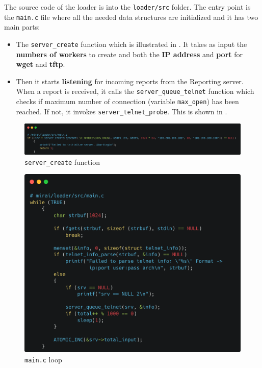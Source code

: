 The source code of the loader is into the \texttt{loader/src} folder. The entry point is the \texttt{main.c} file where all the needed data structures are initialized and it has two main parts:

\begin{itemize}
    \item The \texttt{server\_create} function which is illustrated in . It takes as input the \textbf{numbers of workers} to create and both the \textbf{IP address} and \textbf{port} for \textbf{wget} and \textbf{tftp}.
    \item Then it starts \textbf{listening} for incoming reports from the Reporting server. When a report is received, it calls the \texttt{server\_queue\_telnet} function which checks if maximum number of connection (variable \texttt{max\_open}) has been reached. If not, it invokes \texttt{server\_telnet\_probe}. This is shown in .
\end{itemize}

\begin{figure}[ht]
    \centering
    \includegraphics[scale=0.1]{resources/images/server_create.png}
    \caption{\texttt{server\_create} function}
    \label{fig:server-create}
\end{figure}

\begin{figure}[ht]
    \centering
    \includegraphics[scale=0.15]{resources/images/main.png}
    \caption{\texttt{main.c} loop}
    \label{fig:mainloop}
\end{figure}


